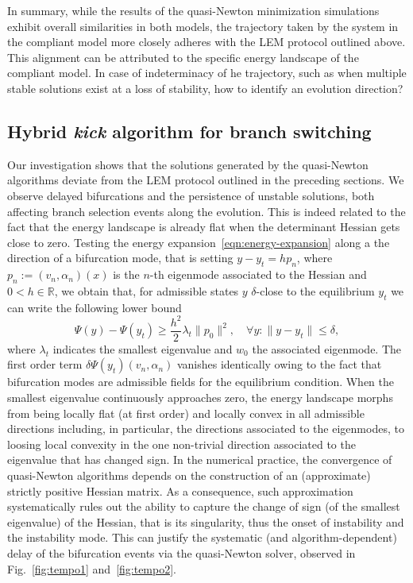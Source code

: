 In summary, while the results of the quasi-Newton minimization simulations exhibit overall similarities in both models, the trajectory taken by the system in the compliant model more closely adheres with the LEM protocol outlined above. This alignment can be attributed to the specific energy landscape of the compliant model. In case of indeterminacy of he trajectory, such as when multiple stable solutions exist at a loss of stability, how to identify an evolution direction?

\subsection{Hybrid \emph{kick} algorithm  for branch switching}
Our investigation shows that the solutions generated by the quasi-Newton algorithms deviate from the LEM protocol outlined in the preceding sections. We observe delayed bifurcations and the persistence of unstable solutions, {both affecting} branch selection events along the evolution.  This is indeed related to the fact that the energy landscape is already flat when the determinant Hessian gets close to zero. 
    Testing the energy expansion~\eqref{eqn:energy-expansion} 
    along a the direction of a bifurcation mode, that is setting $y-y_t=h p_n$, where $p_n:=(v_n, \alpha_n)(x)$ is the $n$-th eigenmode associated to the Hessian and $0<h\in \mathbb R$, we obtain that, for admissible states $y$ $\delta$-close to the equilibrium $y_t$ we can write the following lower bound
$$
\Psi(y)-\Psi(y_t)\geq \frac{h^2}{2}\lambda_t \|p_0\|^2, \quad \forall y: \|y - y_t\| \leq \delta,
$$
    where $\lambda_t$ indicates the smallest eigenvalue and $w_0$ the associated eigenmode. The first order term $\delta\Psi(y_t)(v_n, \alpha_n)$ vanishes identically owing to the fact that bifurcation modes are admissible fields for the equilibrium condition. 
When the smallest eigenvalue continuously approaches zero, the energy landscape morphs from being locally flat (at first order) and locally convex in all admissible directions including, in particular, the directions associated to the eigenmodes, to loosing local convexity in the one non-trivial direction associated to the eigenvalue that has changed sign. 
In the numerical practice, 
the convergence of quasi-Newton algorithms depends on the construction of an (approximate) strictly positive Hessian matrix.
As a consequence, such approximation systematically rules out the ability to capture the change of sign (of the smallest eigenvalue) of the Hessian, that is its singularity, thus the onset of instability and the instability mode. 
This can justify the systematic (and algorithm-dependent) delay of the bifurcation events via the quasi-Newton solver, observed in Fig.~\ref{fig:tempo1} and~\ref{fig:tempo2}.

